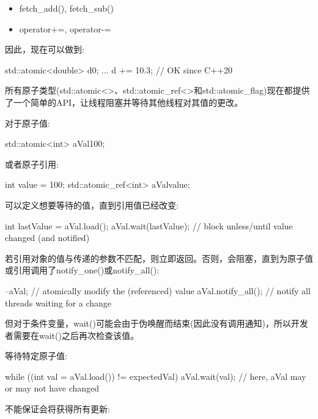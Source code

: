 \begin{itemize}
\item
fetch\_add(), fetch\_sub()

\item
operator+=, operator-=
\end{itemize}

因此，现在可以做到:

\begin{cpp}
std::atomic<double> d{0};
...
d += 10.3; // OK since C++20
\end{cpp}


所有原子类型(std::atomic<>、std::atomic\_ref<>和std::atomic\_flag)现在都提供了一个简单的API，让线程阻塞并等待其他线程对其值的更改。

对于原子值:

\begin{cpp}
std::atomic<int> aVal{100};
\end{cpp}

或者原子引用:

\begin{cpp}
int value = 100;
std::atomic_ref<int> aVal{value};
\end{cpp}

可以定义想要等待的值，直到引用值已经改变:

\begin{cpp}
int lastValue = aVal.load();
aVal.wait(lastValue); // block unless/until value changed (and notified)
\end{cpp}

若引用对象的值与传递的参数不匹配，则立即返回。否则，会阻塞，直到为原子值或引用调用了notify\_one()或notify\_all():

\begin{cpp}
--aVal; // atomically modify the (referenced) value
aVal.notify_all(); // notify all threads waiting for a change
\end{cpp}

但对于条件变量，wait()可能会由于伪唤醒而结束(因此没有调用通知)，所以开发者需要在wait()之后再次检查该值。

等待特定原子值:

\begin{cpp}
while ((int val = aVal.load()) != expectedVal) {
	aVal.wait(val);
	// here, aVal may or may not have changed
}
\end{cpp}

不能保证会将获得所有更新:


